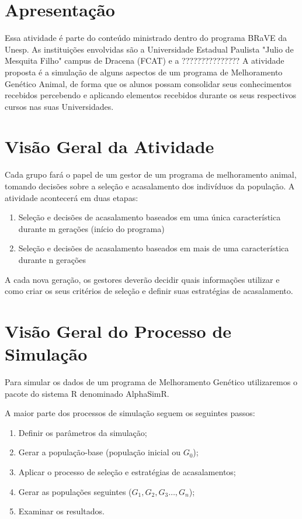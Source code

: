 \documentclass{article}\usepackage[]{graphicx}\usepackage[]{xcolor}
\begin{document}
\section{Apresentação}
Essa atividade é parte do conteúdo ministrado dentro do programa BRaVE da Unesp. As instituições envolvidas são a Universidade Estadual Paulista "Julio de Mesquita Filho" campus de Dracena (FCAT) e a ???????????????
A atividade proposta é a simulação de alguns aspectos de um programa de Melhoramento Genético Animal, de forma que os alunos possam consolidar seus conhecimentos recebidos percebendo e aplicando elementos recebidos durante os seus respectivos cursos nas suas Universidades.
\section{Visão Geral da Atividade}
Cada grupo fará o papel de um gestor de um programa de melhoramento animal, tomando decisões sobre a seleção e acasalamento dos indivíduos da população.
A atividade acontecerá em duas etapas:
\begin{enumerate}
\item Seleção e decisões de acasalamento baseados em uma única característica durante m gerações (início do programa)
\item Seleção e decisões de acasalamento baseados em mais de uma característica durante n gerações
\end{enumerate}
A cada nova geração, os gestores deverão decidir quais informações utilizar e como criar os seus critérios de seleção e definir suas estratégias de acasalamento.

\section{Visão Geral do Processo de Simulação}

Para simular os dados de um programa de Melhoramento Genético utilizaremos o pacote do sistema R denominado AlphaSimR.

A maior parte dos processos de simulação seguem os seguintes passos:

\begin{enumerate}
\item Definir os parâmetros da simulação;
\item Gerar a população-base (população inicial ou $G_0$);
\item Aplicar o processo de seleção e estratégias de acasalamentos;
\item Gerar as populações seguintes ($G_1, G_2, G_3\dots, G_n$); 
\item Examinar os resultados.
\end{enumerate}
\end{document}
